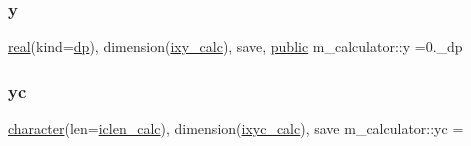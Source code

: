 \mbox{\label{namespacem__calculator_affdb371c2a552e5a31bfe542a2b837cd}} 
\subsubsection{\texorpdfstring{y}{y}}
{\footnotesize\ttfamily \hyperlink{read__watch_83_8txt_abdb62bde002f38ef75f810d3a905a823}{real}(kind=\hyperlink{namespacem__calculator_aefb5a6c3001bb0f09ed82decb6def950}{dp}), dimension(\hyperlink{namespacem__calculator_addb6e867e526d278a9901ef8e7ff8bb6}{ixy\+\_\+calc}), save, \hyperlink{M__stopwatch_83_8txt_a2f74811300c361e53b430611a7d1769f}{public} m\+\_\+calculator\+::y =0.\+\_\+dp}

\mbox{\label{namespacem__calculator_a8ce138d24e6b41a29b5b6cec70e78086}} 
\subsubsection{\texorpdfstring{yc}{yc}}
{\footnotesize\ttfamily \hyperlink{option__stopwatch_83_8txt_abd4b21fbbd175834027b5224bfe97e66}{character}(len=\hyperlink{namespacem__calculator_accf705491e8bd9b3d2f0d04fd13712e7}{iclen\+\_\+calc}), dimension(\hyperlink{namespacem__calculator_a7f11fbca3121837187391693c8bf3f01}{ixyc\+\_\+calc}), save m\+\_\+calculator\+::yc =\textquotesingle{} \textquotesingle{}\hspace{0.3cm}{\ttfamily [private]}}

